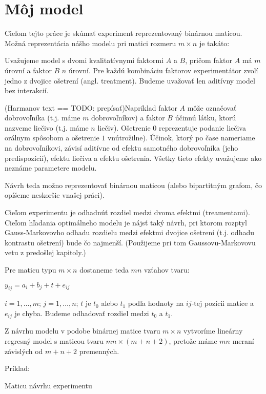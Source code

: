 \section{Môj model}
\label{my model}

Cieľom tejto práce je skúmať experiment reprezentovaný binárnou maticou.
Možná reprezentácia nášho modelu pri matici rozmeru $m \times n$ je takáto:

Uvažujeme model s dvomi kvalitatívnymi faktormi $A$ a $B$, 
pričom faktor $A$ má $m$ úrovní a faktor $B$ $n$ úrovní. 
Pre každú kombináciu faktorov experimentátor zvolí jedno z dvojice ošetrení (angl. treatment).
Budeme uvažovať len aditívny model bez interakcií.

(Harmanov text == TODO: prepísať)Napríklad faktor $A$ môže označovať dobrovoľníka (t.j. máme $m$ dobrovoľníkov) 
a faktor $B$ účinnú látku, ktorú nazveme liečivo (t.j. máme $n$ liečiv). 
Ošetrenie $0$ reprezentuje podanie liečiva orálnym spôsobom a ošetrenie $1$ vnútrožilne).
Účinok, ktorý po čase nameriame na dobrovoľníkovi, 
závisí aditívne od efektu samotného dobrovoľníka (jeho predispozícií), 
efektu liečiva a efektu ošetrenia. 
Všetky tieto efekty uvažujeme ako neznáme parametere modelu.

Návrh teda možno reprezentovať binárnou maticou 
(alebo bipartitným grafom, čo opíšeme neskoršie vnašej práci).

Cieľom experimentu je odhadnúť rozdiel medzi dvoma efektmi (treamentami).
Cieľom hľadania optimálneho modelu je nájsť taký návrh, pri ktorom
rozptyl Gauss-Markovovho odhadu rozdielu medzi efektmi dvojice ošetrení (t.j. odhadu kontrastu ošetrení) bude čo najmenší.
(Použijeme pri tom Gaussovu-Markovovu vetu z predošlej kapitoly.)

Pre maticu typu $m \times n$ dostaneme teda $mn$ vzťahov tvaru:

\begin{center}
$
y_{ij} = a_i + b_j + t + e_{ij}
$
\end{center}

$i = 1, \ldots, m$; $j = 1, \ldots, n$; $t$ je $t_0$ alebo $t_1$ podľa hodnoty na $ij$-tej pozícii matice a $e_{ij}$ je chyba.
Budeme odhadovať rozdiel medzi $t_0$ a $t_1$.

Z návrhu modelu v podobe binárnej matice tvaru $m \times n$ vytvoríme lineárny regresný model
s maticou tvaru $mn \times (m + n + 2)$, pretože máme $mn$ meraní závislých od $m + n + 2$ premenných.

Príklad:

Maticu návrhu experimentu

